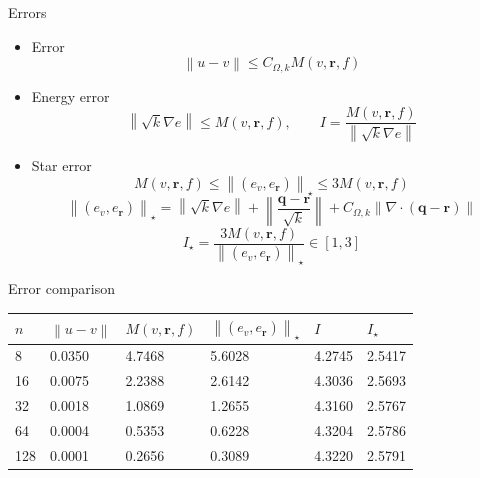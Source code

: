 \documentclass{beamer}
\newcommand{\norm}[1]{\left\lVert#1\right\rVert}
\begin{document}
    \begin{frame}{Errors}
        \begin{itemize}
            \item Error
            \begin{equation*}
                \norm{u - v} \leq C_{\Omega, k} M(v, \bm{r}, f)
            \end{equation*}
            \item Energy error
            \begin{equation*}
                \norm{\sqrt{k} \nabla e} \leq M(v, \bm{r}, f) ,\quad \quad I = \frac{M(v, \bm{r}, f)}{\norm{\sqrt{k} \nabla e}}
            \end{equation*}
            \item Star error
            \begin{equation*}
                M(v, \bm{r}, f) \leq \norm{(e_v, e_{\bm{r}})}_\star \leq 3 M(v, \bm{r}, f)
            \end{equation*}
            \begin{equation*}
                \norm{(e_v, e_{\bm{r}})}_\star = \norm{\sqrt{k} \nabla e} + \norm{\frac{\bm{q} - \bm{r}}{\sqrt{k}}} + C_{\Omega, k} \norm{\nabla \cdot (\bm{q} - \bm{r})}
            \end{equation*}
            \begin{equation*}
                I_\star = \frac{3M(v, \bm{r}, f)}{\norm{(e_v, e_{\bm{r}})}_\star} \in [1, 3]
            \end{equation*}
        \end{itemize}
    \end{frame}

    \begin{frame}{Error comparison}
        \begin{table}[]
            \begin{tabular}{l|lllll}
            $n$ & $\norm{u - v}$ & $M(v, \bm{r}, f)$ & $\norm{(e_v, e_{\bm{r}})}_\star$ & $I$ & $I_\star$ \\ \hline
            8   & 0.0350 & 4.7468 & 5.6028 & 4.2745 & 2.5417 \\
            16  & 0.0075 & 2.2388 & 2.6142 & 4.3036 & 2.5693 \\
            32  & 0.0018 & 1.0869 & 1.2655 & 4.3160 & 2.5767 \\
            64  & 0.0004 & 0.5353 & 0.6228 & 4.3204 & 2.5786 \\
            128 & 0.0001 & 0.2656 & 0.3089 & 4.3220 & 2.5791
            \end{tabular}
            \end{table}
    \end{frame}
\end{document}
